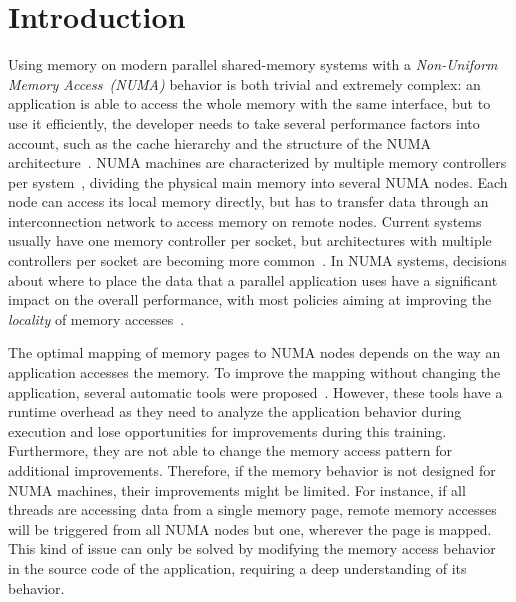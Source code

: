 
\section{Introduction}
\label{sec:intro}

Using memory on modern parallel shared-memory systems with a \emph{Non-Uniform Memory Access~(NUMA)} behavior is both trivial and extremely complex: an application is able to access the whole memory with the same interface, but to use it efficiently, the developer needs to take several performance factors into account, such as the cache hierarchy and the structure of the NUMA architecture~\cite{Drepper07What}.
NUMA machines are characterized by multiple memory controllers per system~\cite{Awasthi2010}, dividing the physical main memory into several NUMA nodes.
Each node can access its local memory directly, but has to transfer data
through an interconnection network to access memory on remote nodes.
Current systems usually have one memory controller per socket, but architectures with multiple controllers per socket are becoming more common~\cite{AMD2012}.
In NUMA systems, decisions about where to place the data that a parallel
application uses have a significant impact on the overall performance, with
most policies aiming at improving the \emph{locality} of memory accesses~\cite{Diener2015}.

The optimal mapping of memory pages to NUMA nodes depends on the way an application accesses the memory.
To improve the mapping without changing the application, several automatic tools were proposed~\cite{Corbet,Dashti2013,Diener2014,Piccoli2014}.
However, these tools have a runtime overhead as they need to analyze the application behavior during execution and lose opportunities for improvements during this training.
Furthermore, they are not able to change the memory access pattern for additional improvements.
Therefore, if the memory behavior is not designed for NUMA machines, their improvements might be limited.
For instance, if all threads are accessing data from a single memory
page, remote memory accesses will be triggered from all NUMA nodes but one,
wherever the page is mapped.
This kind of issue can only be solved by modifying the memory access behavior
in the source code of the application, requiring a deep understanding of its behavior.

